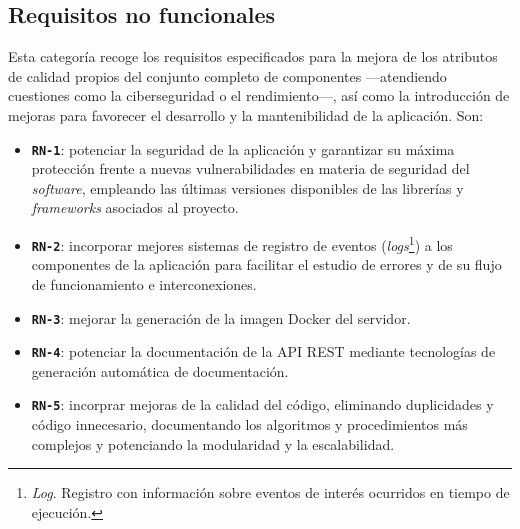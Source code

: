 \subsection{Requisitos no funcionales}
\label{subsec:listaReqsNoFuncionales}
Esta categoría recoge los requisitos especificados para la mejora de los atributos de calidad propios del conjunto completo de componentes ---atendiendo cuestiones como la ciberseguridad o el rendimiento---, así como la introducción de mejoras para favorecer el desarrollo y la mantenibilidad de la aplicación. Son:
\begin{itemize}
    \item \texttt{\textbf{RN-1}}: potenciar la seguridad de la aplicación y garantizar su máxima protección frente a nuevas vulnerabilidades en materia de seguridad del \textit{software}, empleando las últimas versiones disponibles de las librerías y \textit{frameworks} asociados al proyecto.
    \item \texttt{\textbf{RN-2}}: incorporar mejores sistemas de registro de eventos (\textit{logs}\footnote{\textit{Log}. Registro con información sobre eventos de interés ocurridos en tiempo de ejecución.}) a los componentes de la aplicación para facilitar el estudio de errores y de su flujo de funcionamiento e interconexiones.
    \item \texttt{\textbf{RN-3}}: mejorar la generación de la imagen Docker del servidor.
    \item \texttt{\textbf{RN-4}}: potenciar la documentación de la API REST mediante tecnologías de generación automática de documentación.
    \item \texttt{\textbf{RN-5}}: incorprar mejoras de la calidad del código, eliminando duplicidades y código innecesario, documentando los algoritmos y procedimientos más complejos y potenciando la modularidad y la escalabilidad.
\end{itemize}

